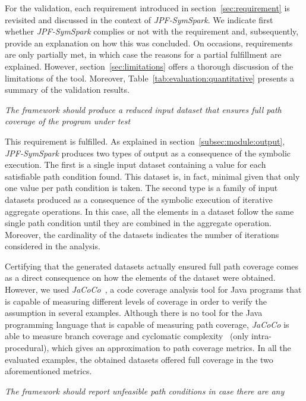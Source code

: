 
For the validation, each requirement introduced in section~\ref{sec:requirement} is revisited and discussed in the context of \textit{JPF-SymSpark}. We indicate first whether \textit{JPF-SymSpark} complies or not with the requirement and, subsequently, provide an explanation on how this was concluded. On occasions, requirements are only partially met, in which case the reasons for a partial fulfillment are explained. However, section~\ref{sec:limitations} offers a thorough discussion of the limitations of the tool. Moreover, Table~\ref{tab:evaluation:quantitative} presents a summary of the validation results.

\begin{itemize}
 \textit{The framework should produce a reduced input dataset that ensures full path coverage of the program under test}

This requirement is fulfilled. As explained in section~\ref{subsec:module:output}, \textit{JPF-SymSpark} produces two types of output as a consequence of the symbolic execution. The first is a single input dataset containing a value for each satisfiable path condition found. This dataset is, in fact, minimal given that only one value per path condition is taken. The second type is a family of input datasets produced as a consequence of the symbolic execution of iterative aggregate operations. In this case, all the elements in a dataset follow the same single path condition until they are combined in the aggregate operation. Moreover, the cardinality of the datasets indicates the number of iterations considered in the analysis.

Certifying that the generated datasets actually ensured full path coverage comes as a direct consequence on how the elements of the dataset were obtained. However, we used \textit{JaCoCo}~\cite{JaCoCo2017}, a code coverage analysis tool for Java programs that is capable of measuring different levels of coverage in order to verify the assumption in several examples. Although there is no tool for the Java programming language that is capable of measuring path coverage, \textit{JaCoCo} is able to measure branch coverage and cyclomatic complexity~\cite{McCabe1976} (only intra-procedural), which gives an approximation to path coverage metrics. In all the evaluated examples, the obtained datasets offered full coverage in the two aforementioned metrics.

 \textit{The framework should report unfeasible path conditions in case there are any}


\end{itemize}
